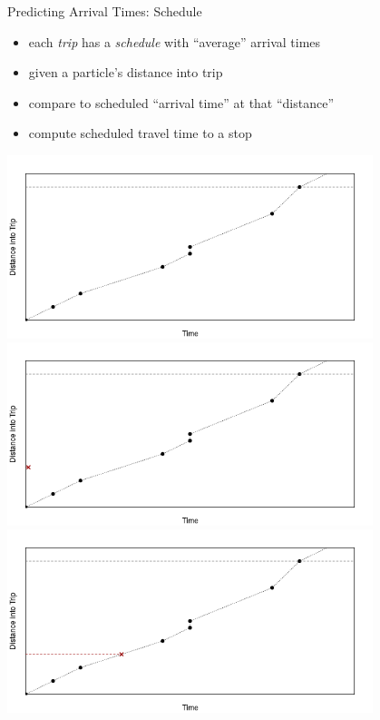 \documentclass[10pt,t]{beamer}
\begin{document}
\begin{frame}{Predicting Arrival Times: Schedule}
  \onslide<+->

  \begin{itemize}[<+- | alert@+>]
  \item each \emph{trip} has a \emph{schedule} with ``average'' arrival times
  \item given a particle's distance into trip
  \item compare to scheduled ``arrival time'' at that ``distance''
  \item compute scheduled travel time to a stop
  \end{itemize}

  \begin{overprint}
    \centering
    \includegraphics[width=0.8\textwidth]{figs/pred-sched-frame1.png}
    \centering
    \includegraphics[width=0.8\textwidth]{figs/pred-sched-frame2.png}
    \centering
    \includegraphics[width=0.8\textwidth]{figs/pred-sched-frame3.png}

\end{overprint}
\end{frame}
\end{document}
